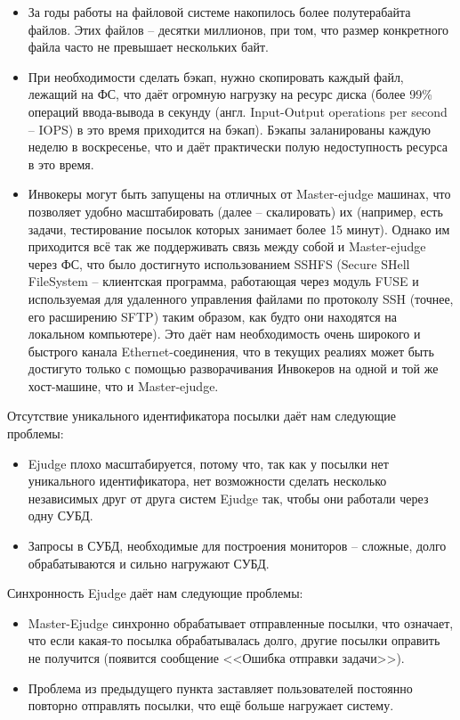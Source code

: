 \begin{itemize}
    \item За годы работы на файловой системе накопилось более полутерабайта файлов.
Этих файлов -- десятки миллионов, при том, что размер конкретного файла часто не превышает нескольких байт.
    \item При необходимости сделать бэкап, нужно скопировать каждый файл, лежащий на ФС, что даёт огромную нагрузку на ресурс диска
(более 99\% операций ввода-вывода в секунду (англ. Input-Output operations per second -- IOPS) в это время приходится на бэкап). 
Бэкапы заланированы каждую неделю в воскресенье, что и даёт практически полую недоступность ресурса в это время.
    \item Инвокеры могут быть запущены на отличных от Master-ejudge машинах, что позволяет удобно масштабировать (далее -- скалировать) их (например, есть задачи, тестирование посылок которых занимает более 15 минут). 
    Однако им приходится всё так же поддерживать связь между собой и Master-ejudge через ФС, 
    что было достигнуто использованием SSHFS (Secure SHell FileSystem -- клиентская программа, работающая через модуль FUSE и используемая для удаленного управления файлами по протоколу SSH (точнее, его расширению SFTP) таким образом, как будто они находятся на локальном компьютере).
    Это даёт нам необходимость очень широкого и быстрого канала Ethernet-соединения, что в текущих реалиях может быть достигуто только с помощью разворачивания Инвокеров на одной и той же хост-машине, что и Master-ejudge.

\end{itemize}


Отсутствие уникального идентификатора посылки даёт нам следующие проблемы:

\begin{itemize}
    \item Ejudge плохо масштабируется, потому что, так как у посылки нет уникального идентификатора, 
нет возможности сделать несколько независимых друг от друга систем Ejudge так, чтобы они работали через одну СУБД.
    \item Запросы в СУБД, необходимые для построения мониторов -- сложные, долго обрабатываются и сильно нагружают СУБД.
\end{itemize}

Синхронность Ejudge даёт нам следующие проблемы:

\begin{itemize}
    \item Master-Ejudge синхронно обрабатывает отправленные посылки, что означает, что 
если какая-то посылка обрабатывалась долго, другие посылки оправить не получится
(появится сообщение <<Ошибка отправки задачи>>).
    \item Проблема из предыдущего пункта заставляет пользователей постоянно повторно отправлять посылки, что ещё больше нагружает систему.
\end{itemize}

